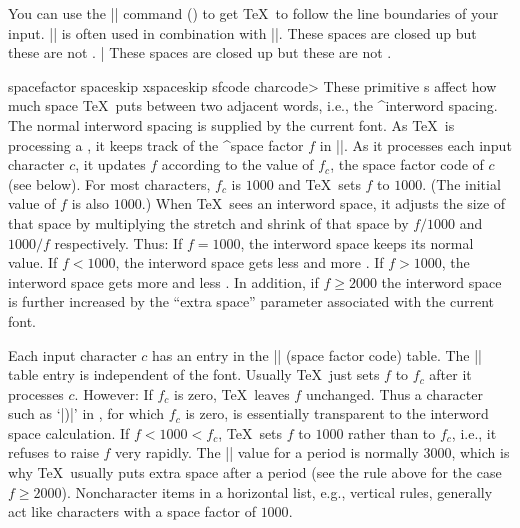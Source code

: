 You can use the |\obeylines| command (\xref{\obeylines}) to get \TeX\
to follow the line boundaries of your input.  |\obeylines| is often
used in combination with |\obeyspaces|.
\example 
These     spaces    are    closed   up
{\obeyspaces but   these  are     not   }.
|
\produces
These     spaces    are    closed   up
{\obeyspaces but   these  are     not   }.
\endexample
\enddesc

\begindesc
\cts spacefactor {}
\cts spaceskip {}
\cts xspaceskip {\param{glue}}
\cts sfcode {\<charcode> }
\explain
These primitive s affect how much space \TeX\
puts between two adjacent words, i.e., the ^{interword spacing}.
The normal interword spacing is supplied by the current font.
As \TeX\ is processing a \minref{horizontal list}, it keeps track of the
^{space factor} $f$ in |\spacefactor|.
As it processes each input character $c$, it updates $f$ according to the
value of $f_c$, the space factor code of $c$ (see below).
For most characters, $f_c$ is $1000$ and \TeX\ sets $f$ to $1000$.
(The initial value of $f$ is also $1000$.)
When \TeX\ sees an interword space, it adjusts the size of that space 
by multiplying the stretch and shrink of that space by 
$f/1000$ and $1000/f$ respectively.
Thus:
\olist\compact
\li If $f=1000$, the interword space keeps its normal value.
\li If $f<1000$, the interword space gets less 
and more .
\li If $f>1000$, the interword space gets more \minref{stretch}
and less \minref{shrink}.
\endolist
In addition, if $f\ge2000$ the interword space is further increased by the
``extra space'' parameter associated with the current font.

Each 
input character $c$ has an entry in the |\sfcode| (space factor code)
table.
The |\sfcode| table entry is independent of the font.
Usually \TeX\ just sets $f$ to $f_c$ after it processes $c$.
However:
\ulist
\li If $f_c$ is zero, \TeX\ leaves $f$ unchanged.
Thus a character such as `|)|' in \plainTeX,
for which $f_c$ is zero, is essentially transparent to
the interword space calculation.
\li If $f<1000<f_c$, \TeX\ sets $f$ to $1000$ rather than to $f_c$,
i.e., it refuses to raise $f$ very rapidly.
\endulist
The |\sfcode| value for a period is normally $3000$, 
which is why \TeX\ usually puts extra space after a period
(see the rule above for the case $f\ge2000$).
Noncharacter items in a horizontal list, e.g., vertical rules,
generally act like characters with a space factor of $1000$.

